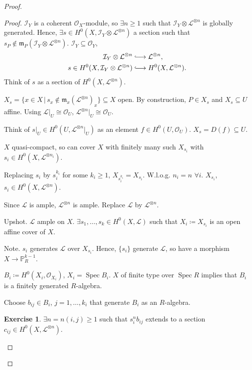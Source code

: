 \documentclass[12pt]{article}
\DeclareMathOperator{\Spec}{Spec}
\theoremstyle{definition}
\newtheorem*{exercise}{Exercise}
\begin{document}
\begin{proof}
\begin{proof}
$\mathcal{I}_Y$ is a coherent $\mathcal{O}_X$-module, so $\exists n\geq1$ such that $\mathcal{I}_Y\otimes\mathcal{L}^{\otimes n}$ is globally generated. Hence, $\exists s\in H^0(X,\mathcal{I}_Y\otimes\mathcal{L}^{\otimes n})$ a section such that $s_P\notin\mathfrak{m}_P(\mathcal{I}_Y\otimes\mathcal{L}^{\otimes n})$. $\mathcal{I}_Y\subseteq\mathcal{O}_Y$,
\begin{align*}
\mathcal{I}_Y\otimes\mathcal{L}^{\otimes n}&\lhook\joinrel\longrightarrow\mathcal{L}^{\otimes n},\\
s\in H^0(X,\mathcal{I}_Y\otimes\mathcal{L}^{\otimes n})&\lhook\joinrel\longrightarrow H^0(X,\mathcal{L}^{\otimes n}).
\end{align*}
Think of $s$ as a section of $H^0(X,\mathcal{L}^{\otimes n})$.

$X_s=\{x\in X\,|\,s_x\notin\mathfrak{m}_x(\mathcal{L}^{\otimes n})_x\}\subseteq X$ open. By construction, $P\in X_s$ and $X_s\subseteq U$ affine. Using $\mathcal{L}|_U\cong\mathcal{O}_U$, $\mathcal{L}^{\otimes n}|_U\cong\mathcal{O}_U$.

Think of $s|_U\in H^0(U,\mathcal{L}^{\otimes n}|_U)$ as an element $f\in H^0(U,\mathcal{O}_U)$. $X_s=D(f)\subseteq U$.

$X$ quasi-compact, so can cover $X$ with finitely many such $X_{s_i}$ with $s_i\in H^0(X,\mathcal{L}^{\otimes n_i})$.

Replacing $s_i$ by $s_i^{k_i}$ for some $k_i\geq1$, $X_{s_i^{k_i}}=X_{s_i}$. W.l.o.g. $n_i=n$ $\forall i$. $X_{s_i}$, $s_i\in H^0(X,\mathcal{L}^{\otimes n})$.

Since $\mathcal{L}$ is ample, $\mathcal{L}^{\otimes n}$ is ample. Replace $\mathcal{L}$ by $\mathcal{L}^{\otimes n}$.

Upshot. $\mathcal{L}$ ample on $X$. $\exists s_1,\ldots,s_k\in H^0(X,\mathcal{L})$ such that $X_i\coloneqq X_{s_i}$ is an open affine cover of $X$.

Note. $s_i$ generates $\mathcal{L}$ over $X_{s_i}$. Hence, $\{s_i\}$ generate $\mathcal{L}$, so have a morphism $X\rightarrow\mathbb{P}_R^{k-1}$.

$B_i\coloneqq H^0(X_i,\mathcal{O}_{X_i})$, $X_i=\Spec B_i$. $X$ of finite type over $\Spec R$ implies that $B_i$ is a finitely generated $R$-algebra.

Choose $b_{ij}\in B_i$, $j=1,\ldots,k_i$ that generate $B_i$ as an $R$-algebra.

\begin{exercise}
$\exists n=n(i,j)\geq1$ such that $s_i^nb_{ij}$ extends to a section $c_{ij}\in H^0(X,\mathcal{L}^{\otimes n})$.
\end{exercise}


\end{proof}
\end{proof}
\end{document}
